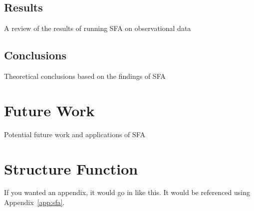 \documentclass[12pt, oneside]{smuthesis}
\begin{document}
\section{\sc Results} \label{results}

A review of the results of running SFA on observational data

\section{\sc Conclusions} \label{conclusions}

Theoretical conclusions based on the findings of SFA

\chapter{\sc Future Work} \label{futureWork}

Potential future work and applications of SFA


\appendix

\chapter{Structure Function} \label{appendixSFA}
\label{app:sfa}
If you wanted an appendix, it would go in like this.  It would be 
referenced using Appendix~\ref{app:sfa}.


\begin{singlespace}

\end{singlespace}
\end{document}
